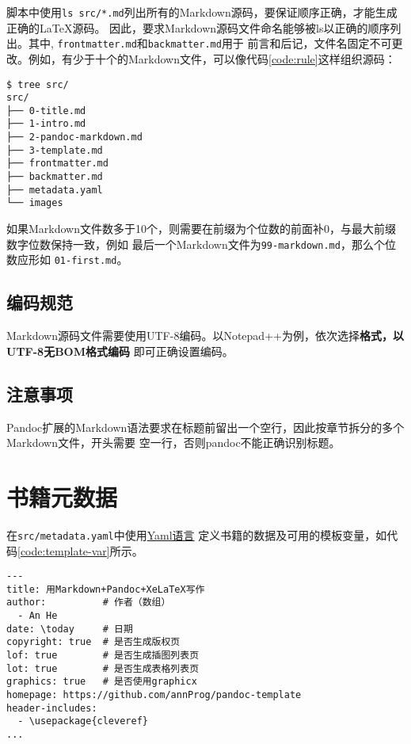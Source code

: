 \documentclass[cn]{elegantbook}
\newcommand{\passthrough}[1]{#1}
\begin{document}
脚本中使用\passthrough{\lstinline!ls src/*.md!}列出所有的Markdown源码，要保证顺序正确，才能生成正确的LaTeX源码。
因此，要求Markdown源码文件命名能够被ls以正确的顺序列出。其中,
\passthrough{\lstinline!frontmatter.md!}和\passthrough{\lstinline!backmatter.md!}用于
前言和后记，文件名固定不可更改。例如，有少于十个的Markdown文件，可以像代码\ref{code:rule}这样组织源码：

\begin{lstlisting}[caption=源码命名规范, label=code:rule, float=htbp]
$ tree src/
src/
├── 0-title.md
├── 1-intro.md
├── 2-pandoc-markdown.md
├── 3-template.md
├── frontmatter.md
├── backmatter.md
├── metadata.yaml
└── images
\end{lstlisting}

如果Markdown文件数多于10个，则需要在前缀为个位数的前面补0，与最大前缀数字位数保持一致，例如
最后一个Markdown文件为\passthrough{\lstinline!99-markdown.md!}，那么个位数应形如
\passthrough{\lstinline!01-first.md!}。

\hypertarget{ux7f16ux7801ux89c4ux8303}{%
\subsection{编码规范}\label{ux7f16ux7801ux89c4ux8303}}

Markdown源码文件需要使用UTF-8编码。以Notepad++为例，依次选择\textbf{格式，以UTF-8无BOM格式编码}
即可正确设置编码。

\hypertarget{title:note}{%
\subsection{注意事项}\label{title:note}}

Pandoc扩展的Markdown语法要求在标题前留出一个空行，因此按章节拆分的多个Markdown文件，开头需要
空一行，否则pandoc不能正确识别标题。

\hypertarget{ux4e66ux7c4dux5143ux6570ux636e}{%
\section{书籍元数据}\label{ux4e66ux7c4dux5143ux6570ux636e}}

在\passthrough{\lstinline!src/metadata.yaml!}中使用\href{http://www.ruanyifeng.com/blog/2016/07/yaml.html}{Yaml语言}
定义书籍的数据及可用的模板变量，如代码\ref{code:template-var}所示。

\begin{lstlisting}[label=code:template-var, caption=code:template-var, float=htbp]
---
title: 用Markdown+Pandoc+XeLaTeX写作
author:          # 作者（数组）
  - An He
date: \today     # 日期
copyright: true  # 是否生成版权页
lof: true        # 是否生成插图列表页
lot: true        # 是否生成表格列表页
graphics: true   # 是否使用graphicx
homepage: https://github.com/annProg/pandoc-template
header-includes:
  - \usepackage{cleveref}
...
\end{lstlisting}
\end{document}
